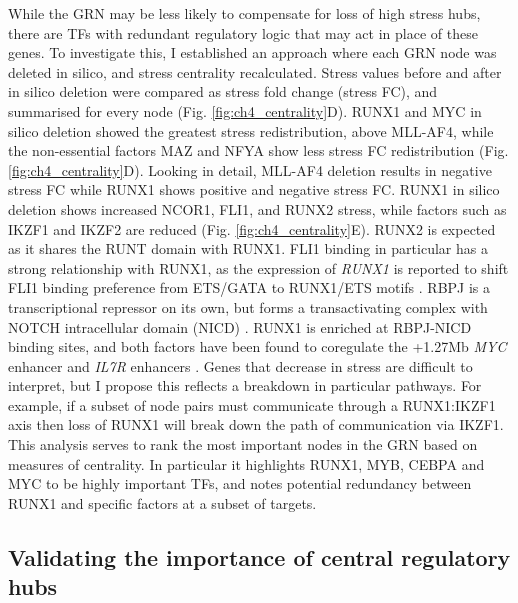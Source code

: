 While the GRN may be less likely to compensate for loss of high stress hubs, there are TFs with redundant regulatory logic that may act in place of these genes. To investigate this, I established an approach where each GRN node was deleted in silico, and stress centrality recalculated. Stress values before and after in silico deletion were compared as stress fold change (stress FC), and summarised for every node (Fig. \ref{fig:ch4_centrality}D). RUNX1 and MYC in silico deletion showed the greatest stress redistribution, above MLL-AF4, while the non-essential factors MAZ and NFYA show less stress FC redistribution (Fig. \ref{fig:ch4_centrality}D). Looking in detail, MLL-AF4 deletion results in negative stress FC while RUNX1 shows positive and negative stress FC. RUNX1 in silico deletion shows increased NCOR1, FLI1, and RUNX2 stress, while factors such as IKZF1 and IKZF2 are reduced (Fig. \ref{fig:ch4_centrality}E). RUNX2 is expected as it shares the RUNT domain with RUNX1. FLI1 binding in particular has a strong relationship with RUNX1, as the expression of \textit{RUNX1} is reported to shift FLI1 binding preference from ETS/GATA to RUNX1/ETS motifs \citep{gilmour_co-operation_2018, lichtinger_runx1_2012}. RBPJ is a transcriptional repressor on its own, but forms a transactivating complex with NOTCH intracellular domain (NICD) \citep{kojika_notch_2001}. RUNX1 is enriched at RBPJ-NICD binding sites, and both factors have been found to coregulate the +1.27Mb \textit{MYC} enhancer and \textit{IL7R} enhancers \citep{choi_runx1_2017, wang_notch1-rbpj_2014}. Genes that decrease in stress are difficult to interpret, but I propose this reflects a breakdown in particular pathways. For example, if a subset of node pairs must communicate through a RUNX1:IKZF1 axis then loss of RUNX1 will break down the path of communication via IKZF1. This analysis serves to rank the most important nodes in the GRN based on measures of centrality. In particular it highlights RUNX1, MYB, CEBPA and MYC to be highly important TFs, and notes potential redundancy between RUNX1 and specific factors at a subset of targets. 





\subsection{Validating the importance of central regulatory hubs}

